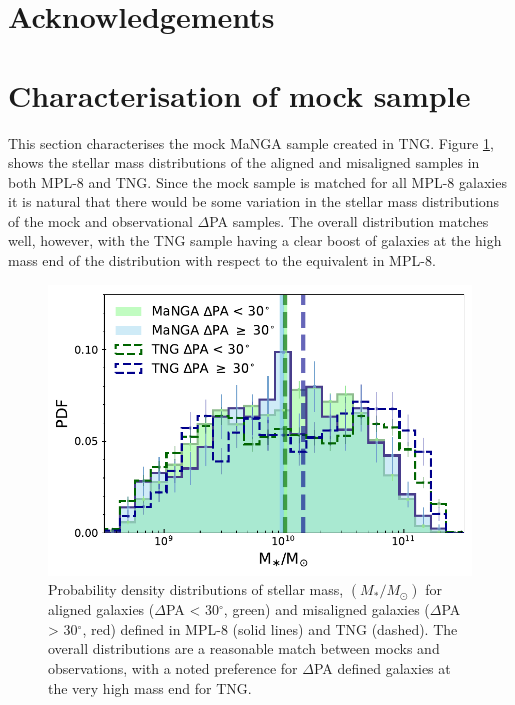 \documentclass[fleqn,usenatbib]{mnras}
\begin{document}




\section*{Acknowledgements}

\appendix

\section{Characterisation of mock sample} \label{sec:mock_appendix}
This section characterises the mock MaNGA sample created in TNG. Figure \ref{fig:TNG_mpl8_stelM}, shows the stellar mass distributions of the aligned and misaligned samples in both MPL-8 and TNG. Since the mock sample is matched for all MPL-8 galaxies it is natural that there would be some variation in the stellar mass distributions of the mock and observational $\Delta$PA samples. The overall distribution matches well, however, with the TNG sample having a clear boost of galaxies at the high mass end of the distribution with respect to the equivalent in MPL-8.

\begin{figure}
	\includegraphics[width=\linewidth]{tng_appendix/delPA_split_stelM_tng_comparison.pdf}
    \caption{Probability density distributions of stellar mass, $(M_{\ast}/M_{\odot})$ for aligned galaxies ($\Delta$PA < 30$^{\circ}$, green) and misaligned galaxies ($\Delta$PA > 30$^{\circ}$, red) defined in MPL-8 (solid lines) and TNG (dashed). The overall distributions are a reasonable match between mocks and observations, with a noted preference for $\Delta$PA defined galaxies at the very high mass end for TNG.}
    \label{fig:TNG_mpl8_stelM}
\end{figure}
\end{document}
